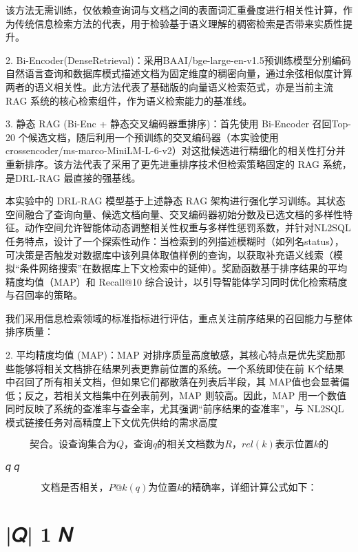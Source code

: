 \documentclass[12pt,a4paper,openright,UTF8]{ctexbook}
\begin{document}
该方法无需训练，仅依赖查询词与文档之间的表面词汇重叠度进行相关性计算，作为传统信息检索方法的代表，用于检验基于语义理解的稠密检索是否带来实质性提升。


2. Bi-Encoder(DenseRetrieval)：采用BAAI/bge-large-en-v1.5预训练模型分别编码自然语言查询和数据库模式描述文档为固定维度的稠密向量，通过余弦相似度计算两者的语义相关性。此方法代表了基础版的向量语义检索范式，亦是当前主流RAG 系统的核心检索组件，作为语义检索能力的基准线。


3. 静态 RAG (Bi-Enc + 静态交叉编码器重排序)：首先使用 Bi-Encoder 召回Top-20 个候选文档，随后利用一个预训练的交叉编码器（本实验使用 crossencoder/ms-marco-MiniLM-L-6-v2）对这批候选进行精细化的相关性打分并重新排序。该方法代表了采用了更先进重排序技术但检索策略固定的 RAG 系统，是DRL-RAG 最直接的强基线。


本实验中的 DRL-RAG 模型基于上述静态 RAG 架构进行强化学习训练。其状态空间融合了查询向量、候选文档向量、交叉编码器初始分数及已选文档的多样性特征。动作空间允许智能体动态调整相关性权重与多样性惩罚系数，并针对NL2SQL 任务特点，设计了一个探索性动作：当检索到的列描述模糊时（如列名status），可决策是否触发对数据库中该列具体取值样例的查询，以获取补充语义线索（模拟“条件网络搜索”在数据库上下文检索中的延伸）。奖励函数基于排序结果的平均精度均值（MAP）和 Recall@10 综合设计，以引导智能体学习同时优化检索精度与召回率的策略。


我们采用信息检索领域的标准指标进行评估，重点关注前序结果的召回能力与整体排序质量：


2. 平均精度均值 (MAP)：MAP 对排序质量高度敏感，其核心特点是优先奖励那些能够将相关文档排在结果列表更靠前位置的系统。一个系统即使在前 K个结果中召回了所有相关文档，但如果它们都散落在列表后半段，其 MAP值也会显著偏低；反之，若相关文档集中在列表前列，MAP 则较高。因此，MAP 用一个数值同时反映了系统的查准率与查全率，尤其强调“前序结果的查准率”，与 NL2SQL 模式链接任务对高精度上下文优先供给的需求高度

\begin{equation}
契合。设查询集合为 Q，查询 q 的相关文档数为 R ，rel (k) 表示位置 k 的
\end{equation}

𝑞 𝑞

\begin{equation}
文档是否相关，P@k(q)为位置k 的精确率，详细计算公式如下：
\end{equation}


\chapter{|𝑄| 1 𝑁}
\end{document}
